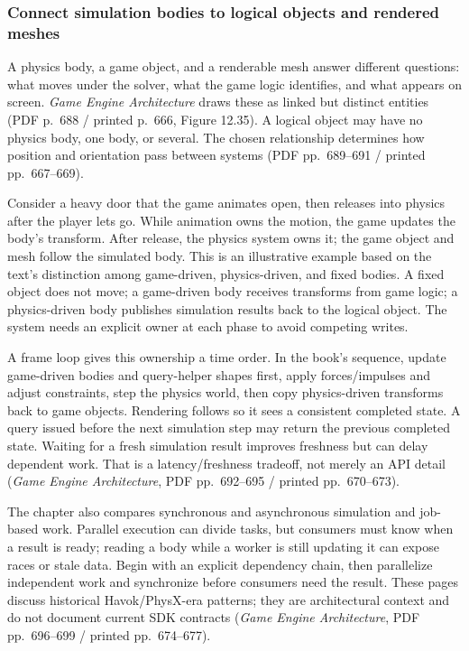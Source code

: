\subsubsection{Connect simulation bodies to logical objects and rendered meshes}\label{06-engine-ii-ch033-connect-simulation-bodies-to-logical-objects-and-rendered-meshes}

A physics body, a game object, and a renderable mesh answer different questions: what moves under the solver, what the game logic identifies, and what appears on screen. \emph{Game Engine Architecture} draws these as linked but distinct entities (PDF p.~688 / printed p.~666, Figure 12.35). A logical object may have no physics body, one body, or several. The chosen relationship determines how position and orientation pass between systems (PDF pp.~689--691 / printed pp.~667--669).

Consider a heavy door that the game animates open, then releases into physics after the player lets go. While animation owns the motion, the game updates the body's transform. After release, the physics system owns it; the game object and mesh follow the simulated body. This is an illustrative example based on the text's distinction among game-driven, physics-driven, and fixed bodies. A fixed object does not move; a game-driven body receives transforms from game logic; a physics-driven body publishes simulation results back to the logical object. The system needs an explicit owner at each phase to avoid competing writes.

A frame loop gives this ownership a time order. In the book's sequence, update game-driven bodies and query-helper shapes first, apply forces/impulses and adjust constraints, step the physics world, then copy physics-driven transforms back to game objects. Rendering follows so it sees a consistent completed state. A query issued before the next simulation step may return the previous completed state. Waiting for a fresh simulation result improves freshness but can delay dependent work. That is a latency/freshness tradeoff, not merely an API detail (\emph{Game Engine Architecture}, PDF pp.~692--695 / printed pp.~670--673).

The chapter also compares synchronous and asynchronous simulation and job-based work. Parallel execution can divide tasks, but consumers must know when a result is ready; reading a body while a worker is still updating it can expose races or stale data. Begin with an explicit dependency chain, then parallelize independent work and synchronize before consumers need the result. These pages discuss historical Havok/PhysX-era patterns; they are architectural context and do not document current SDK contracts (\emph{Game Engine Architecture}, PDF pp.~696--699 / printed pp.~674--677).

